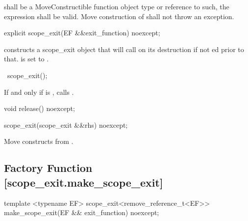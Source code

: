 \documentclass[ebook,11pt,article]{memoir}
\begin{document}
\pnum
\requires {} shall be a MoveConstructible function object type or reference to such, 
the expression  shall be valid.
Move construction of  shall not throw an exception.


\begin{itemdecl}
explicit
scope_exit(EF &&exit_function) noexcept;
\end{itemdecl}


\pnum
\effects constructs a scope_exit object that will call  on its destruction if not ed prior to that.  is set to .

\begin{itemdecl}
~scope_exit();
\end{itemdecl}

\pnum
\effects If and only if  is , calls .


\begin{itemdecl}
void release() noexcept;
\end{itemdecl}

\pnum
\effects {}

\begin{itemdecl}
scope_exit(scope_exit  &&rhs) noexcept;
\end{itemdecl}

\pnum
\effects Move constructs  from . 

\subsection {Factory Function  [scope_exit.make_scope_exit]}

\begin{itemdecl}
template <typename EF>
scope_exit<remove_reference_t<EF>> make_scope_exit(EF && exit_function) noexcept;
\end{itemdecl}

\pnum
\returns {}



\end{document}
